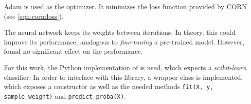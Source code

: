 \ac{Adam} \cite{adam} is used as the optimizer.
It minimizes the loss function provided by \ac{CORN} (see \autoref{eqn:corn:loss}).

The neural network keeps its weights between \dsea{} iterations.
In theory,
  this could improve its performance,
    analogous to \emph{fine-tuning} a pre-trained model.
However,
\cite{dsea_samuel}
found
no significant effect on the performance.


For this work, the Python implementation of \dsea{} \cite{dsea_code} is used,
  which expects a \emph{scikit-learn} classifier.
In order to interface with this library,
a wrapper class is implemented,
  which exposes a constructor as well as the needed methods
  \texttt{fit(X, y, sample_weight)} and
  \texttt{predict_proba(X)}.

\smallskip %
